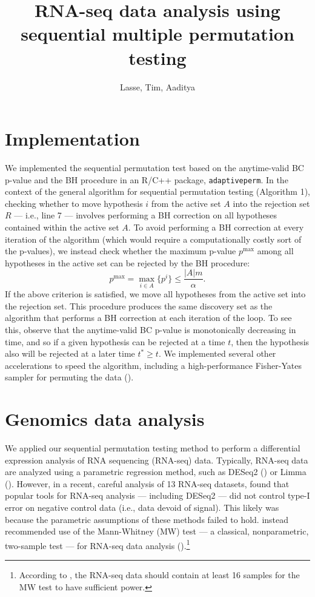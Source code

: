 \documentclass[12pt]{article}
\title{RNA-seq data analysis using sequential multiple permutation testing}
\author{Lasse, Tim, Aaditya}
\begin{document}
	
	\maketitle
	
	\section{Implementation}

	We implemented the sequential permutation test based on the anytime-valid BC p-value and the BH procedure in an R/C++ package, \texttt{adaptiveperm}. In the context of the general algorithm for sequential permutation testing (Algorithm 1), checking whether to move hypothesis $i$ from the active set $A$ into the rejection set $R$ --- i.e., line 7 --- involves performing a BH correction on all hypotheses contained within the active set $A$. To avoid performing a BH correction at every iteration of the algorithm (which would require a computationally costly sort of the p-values), we instead check whether the maximum p-value $p^\textrm{max}$ among all hypotheses in the active set can be rejected by the BH procedure:
	$$ p^\textrm{max} = \max_{i \in A} \{ p^i \} \leq \frac{|A| m}{\alpha}.$$ If the above criterion is satisfied, we move all hypotheses from the active set into the rejection set. This procedure produces the same discovery set as the algorithm that performs a BH correction at each iteration of the loop. To see this, observe that the anytime-valid BC p-value is monotonically decreasing in time, and so if a given hypothesis can be rejected at a time $t$, then the hypothesis also will be rejected at a later time $t^* \geq t$. We implemented several other accelerations to speed the algorithm, including a high-performance Fisher-Yates sampler for permuting the data (\cite{Ting2021}).
	
\section{Genomics data analysis}
	
We applied our sequential permutation testing method to perform a differential expression analysis of RNA sequencing (RNA-seq) data. Typically, RNA-seq data are analyzed using a parametric regression method, such as DESeq2 (\cite{Love2014}) or Limma (\cite{Ritchie2015}). However, in a recent, careful analysis of 13 RNA-seq datasets, \cite{Li2022} found that popular tools for RNA-seq analysis --- including DESeq2 --- did not control type-I error on negative control data (i.e., data devoid of signal). This likely was because the parametric assumptions of these methods failed to hold. \cite{Li2022} instead recommended use of the Mann-Whitney (MW) test --- a classical, nonparametric, two-sample test --- for RNA-seq data analysis (\cite{Mann1947}).\footnote{According to \cite{Li2022}, the RNA-seq data should contain at least 16 samples for the MW test to have sufficient power.}
	
\end{document}
